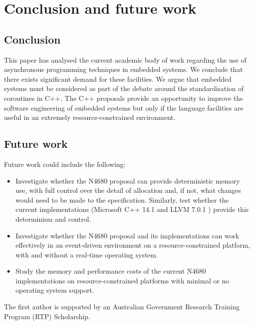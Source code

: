 \section{Conclusion and future work}
\label{section:conclusion}

\subsection{Conclusion}

This paper has analysed the current academic body of work regarding the use of asynchronous programming techniques in embedded systems. We conclude that there exists significant demand for these facilities. We argue that embedded systems must be considered as part of the debate around the standardisation of coroutines in C++. The C++ proposals provide an opportunity to improve the software engineering of embedded systems but only if the language facilities are useful in an extremely resource-constrained environment.

\subsection{Future work}

Future work could include the following:
\begin{itemize}
	\item Investigate whether the N4680 proposal can provide deterministic memory use, with full control over the detail of allocation and, if not, what changes would need to be made to the specification. Similarly, test whether the current implementations (Microsoft C++ 14.1 \cite{Microsoft2018} and LLVM 7.0.1 \cite{LLVMProject2018}) provide this determinism and control.
	\item Investigate whether the N4680 proposal and its implementations can work effectively in an event-driven environment on a resource-constrained platform, with and without a real-time operating system.
	\item Study the memory and performance costs of the current N4680 implementations on resource-constrained platforms with minimal or no operating system support.
\end{itemize}

\begin{acks}
The first author is supported by an Australian Government Research Training Program (RTP) Scholarship.
\end{acks}

